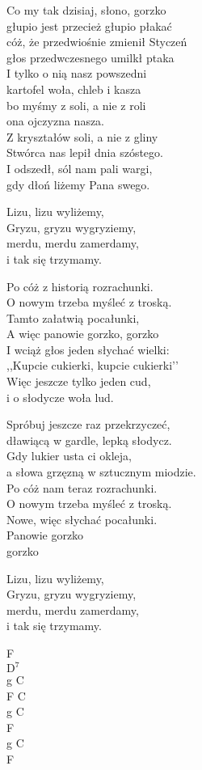\begin{text}
    Co my tak dzisiaj, słono, gorzko\\
    głupio jest przecież głupio płakać\\
    cóż, że przedwiośnie zmienił Styczeń\\
    głos przedwczesnego umilkł ptaka\\
    I tylko o nią nasz powszedni\\
    kartofel woła, chleb i kasza\\
    bo myśmy z soli, a nie z roli\\
    ona ojczyzna nasza.\\
    Z kryształów soli, a nie z gliny\\
    Stwórca nas lepił dnia szóstego.\\
    I odszedł, sól nam pali wargi,\\
    gdy dłoń liżemy Pana swego.

    \vin Lizu, lizu wyliżemy,\\
    \vin Gryzu, gryzu wygryziemy,\\
    \vin merdu, merdu zamerdamy,\\
    \vin i tak się trzymamy.

    Po cóż z historią rozrachunki.\\
    O nowym trzeba myśleć z troską.\\
    Tamto załatwią pocałunki,\\
    A więc panowie gorzko, gorzko\\
    I wciąż głos jeden słychać wielki:\\
    ,,Kupcie cukierki, kupcie cukierki’’\\
    Więc jeszcze tylko jeden cud,\\
    i o słodycze woła lud.

    Spróbuj jeszcze raz przekrzyczeć,\\
    dławiącą w gardle, lepką słodycz.\\
    Gdy lukier usta ci okleja,\\
    a słowa grzęzną w sztucznym miodzie.\\
    Po cóż nam teraz rozrachunki.\\
    O nowym trzeba myśleć z troską.\\
    Nowe, więc słychać pocałunki.\\
    Panowie gorzko\\
    gorzko

    Lizu, lizu wyliżemy,\\
    Gryzu, gryzu wygryziemy,\\
    merdu, merdu zamerdamy,\\
    i tak się trzymamy.
\end{text}
\begin{chord}
    F\\
    $\mathrm{D^7}$\\
    g C\\
    F C\\
    g C\\
    F\\
    g C\\
    F
\end{chord}
